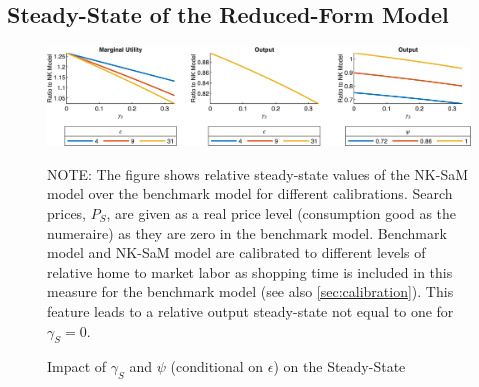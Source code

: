 \documentclass[12pt,3p,authoryear,review]{elsarticle}
\begin{document}
\subsection{Steady-State of the Reduced-Form Model}\label{sec:stst_add_gdp}%
\begin{figure}[h!]%
	\centering%
	\caption{Impact of $\gamma_S$ and $\psi$ (conditional on $\epsilon$) on the Steady-State}\label{fig:stst_add_gdp}%
	\includegraphics[width=\textwidth]{fig_9_stst_gdp.png}\\%
	{\tiny \singlespacing NOTE: The figure shows relative steady-state values of the NK-SaM model over the benchmark model for different calibrations. Search prices, $P_S$, are given as a real price level (consumption good as the numeraire) as they are zero in the benchmark model. Benchmark model and NK-SaM model are calibrated to different levels of relative home to market labor as shopping time is included in this measure for the benchmark model (see also \cref{sec:calibration}). This feature leads to a relative output steady-state not equal to one for $\gamma_S=0$.\par}%
\end{figure}%
\FloatBarrier%
\pagebreak%
\end{document}
